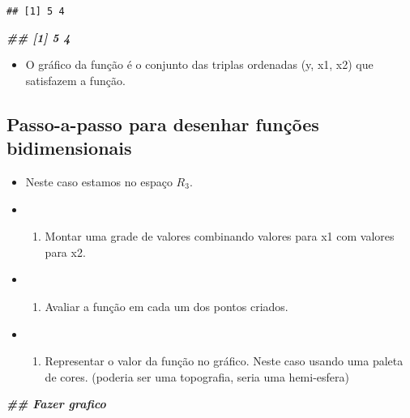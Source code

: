 \documentclass[
]{article}
\newenvironment{Shaded}{\begin{snugshade}}{\end{snugshade}}
\newcommand{\DocumentationTok}[1]{\textcolor[rgb]{0.56,0.35,0.01}{\textbf{\textit{#1}}}}
\providecommand{\tightlist}{%
  \setlength{\itemsep}{0pt}\setlength{\parskip}{0pt}}
\begin{document}
\begin{verbatim}
## [1] 5 4
\end{verbatim}

\begin{Shaded}
\begin{Highlighting}[]
\DocumentationTok{\#\# [1] 5 4}
\end{Highlighting}
\end{Shaded}

\begin{itemize}
\tightlist
\item
  O gráfico da função é o conjunto das triplas ordenadas (y, x1, x2) que
  satisfazem a função.
\end{itemize}

\hypertarget{passo-a-passo-para-desenhar-funuxe7uxf5es-bidimensionais}{%
\subsection{Passo-a-passo para desenhar funções
bidimensionais}\label{passo-a-passo-para-desenhar-funuxe7uxf5es-bidimensionais}}

\begin{itemize}
\item
  Neste caso estamos no espaço \(R_3\).
\item
  \begin{enumerate}
  \def\labelenumi{(\Alph{enumi})}
  \tightlist
  \item
    Montar uma grade de valores combinando valores para x1 com valores
    para x2.
  \end{enumerate}
\item
  \begin{enumerate}
  \def\labelenumi{(\Alph{enumi})}
  \setcounter{enumi}{1}
  \tightlist
  \item
    Avaliar a função em cada um dos pontos criados.
  \end{enumerate}
\item
  \begin{enumerate}
  \def\labelenumi{(\Alph{enumi})}
  \setcounter{enumi}{2}
  \tightlist
  \item
    Representar o valor da função no gráfico. Neste caso usando uma
    paleta de cores. (poderia ser uma topografia, seria uma hemi-esfera)
  \end{enumerate}
\end{itemize}

\begin{Shaded}
\begin{Highlighting}[]
\DocumentationTok{\#\# Fazer grafico}
\end{Highlighting}
\end{Shaded}
\end{document}
